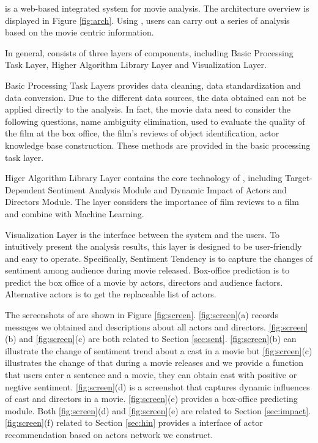 \system is a web-based integrated system for movie analysis. The architecture overview is displayed in Figure \ref{fig:arch}. Using \system, users can carry out a series of analysis based on the movie centric information.
\par In general, \system consists of three layers of components, including Basic Processing Task Layer, Higher Algorithm Library Layer and Visualization Layer.
\par Basic Processing Task Layers provides data cleaning, data standardization and data conversion. Due to the different data sources, the data obtained can not be applied directly to the analysis. In fact, the movie data need to consider the following questions, name ambiguity elimination, used to evaluate the quality of the film at the box office, the film's reviews of object identification, actor knowledge base construction. These methods are provided in the basic processing task layer.
\par Higer Algorithm Library Layer contains the core technology of \system, including Target-Dependent Sentiment Analysis Module and Dynamic Impact of Actors and Directors Module. The layer considers the importance of film reviews to a film and combine with Machine Learning.
\par Visualization Layer is the interface between the system and the users. To intuitively present the analysis results, this layer is designed to be user-friendly and easy to operate. Specifically, Sentiment Tendency is to capture the changes of sentiment among audience during movie released. Box-office prediction is to predict the box office of a movie by actors, directors and audience factors. Alternative actors is to get the replaceable list of actors.
\par The screenshots of \system are shown in Figure \ref{fig:screen}. \ref{fig:screen}(a) records messages we obtained and descriptions about all actors and directors. \ref{fig:screen}(b) and \ref{fig:screen}(c) are both related to Section \ref{sec:sent}. \ref{fig:screen}(b) can illustrate the change of sentiment trend about a cast in a movie but \ref{fig:screen}(c) illustrates the change of that during a movie releases and we provide a function that users enter a sentence and a movie, they can obtain cast with positive or negtive sentiment. \ref{fig:screen}(d) is a screenshot that captures dynamic influences  of cast and directors in a movie. \ref{fig:screen}(e) provides a box-office predicting module. Both \ref{fig:screen}(d) and \ref{fig:screen}(e) are related to Section \ref{sec:impact}. \ref{fig:screen}(f) related to Section \ref{sec:hin} provides a interface of actor recommendation based on actors network we construct.

